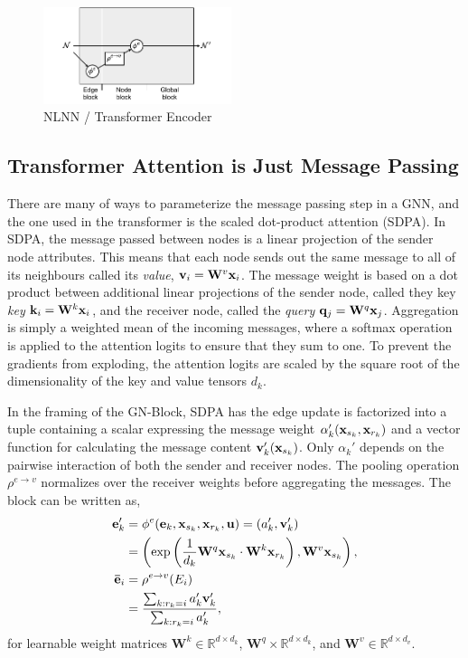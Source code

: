 \begin{figure}
    \centering
    \includegraphics[width=0.49\textwidth]{Figures/transformers/nonlocal.pdf}
    \caption{NLNN / Transformer Encoder}
    \label{fig:transformer}
\end{figure}

\subsection{Transformer Attention is Just Message Passing}
\label{sec:attention}

There are many of ways to parameterize the message passing step in a GNN, and the one used in the transformer is the scaled dot-product attention (SDPA).
In SDPA, the message passed between nodes is a linear projection of the sender node attributes.
This means that each node sends out the same message to all of its neighbours called its \textit{value}, $\mathbf{v}_{i} = \mathbf{W}^v \mathbf{x}_i$.
The message weight is based on a dot product between additional linear projections of the sender node, called they key \textit{key} $\mathbf{k}_{i} = \mathbf{W}^k \mathbf{x}_i$, and the receiver node, called the \textit{query} $\mathbf{q}_{j} = \mathbf{W}^q \mathbf{x}_j$.
Aggregation is simply a weighted mean of the incoming messages, where a softmax operation is applied to the attention logits to ensure that they sum to one.
To prevent the gradients from exploding, the attention logits are scaled by the square root of the dimensionality of the key and value tensors $d_k$.

In the framing of the GN-Block, SDPA has the edge update is factorized into a tuple containing a scalar expressing the message weight $\alpha_k'(\mathbf{x}_{s_k}, \mathbf{x}_{r_k})$ and a vector function for calculating the message content $\mathbf{v}_k'(\mathbf{x}_{s_k})$.
Only $\alpha_k'$ depends on the pairwise interaction of both the sender and receiver nodes.
The pooling operation $\rho^{e \to v}$ normalizes over the receiver weights before aggregating the messages.
The block can be written as,
\begin{equation}
    \begin{aligned}
        \mathbf{e}_k' &= \phi^e(\mathbf{e}_k, \mathbf{x}_{s_k}, \mathbf{x}_{r_k}, \mathbf{u})
        = ( a_k', \mathbf{v}_k' ) \\
        &= \left( \exp \left( \frac{1}{d_k} \mathbf{W}^q \mathbf{x}_{s_k} \cdot \mathbf{W}^k \mathbf{x}_{r_k} \right), \mathbf{W}^v \mathbf{x}_{s_k} \right), \\
        \mathbf{\bar{\mathbf{e}}}_i &= \rho^{e \to v}(E_i) \\
       &= \frac{\sum_{k: r_k = i} a_k' \mathbf{v}_k'}{\sum_{k: r_k = i} a_k'},
    \end{aligned}
\end{equation}
for learnable weight matrices $\mathbf{W}^k \in \mathbb{R}^{d \times d_k}$, $\mathbf{W}^q \times \mathbb{R}^{d \times d_k}$, and $\mathbf{W}^v \in \mathbb{R}^{d \times d_v}$.

